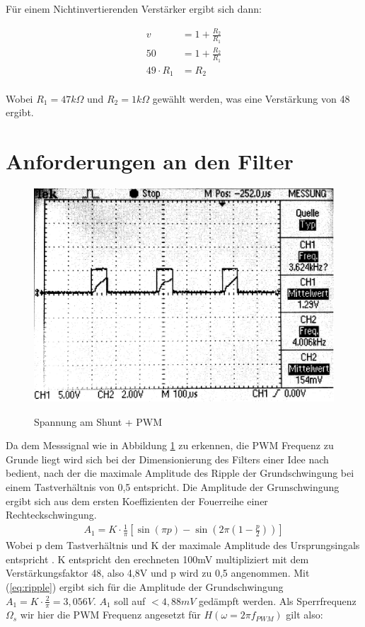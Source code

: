 \documentclass[11pt,twoside,a4paper,openright]{mpreport}
\begin{document}
Für einem Nichtinvertierenden Verstärker ergibt sich dann:

\begin{align*}
v &= 1 + \frac{R_2}{R_1}\\
50 &= 1 + \frac{R_2}{R_1}\\
49\cdot R_1 &= R_2
\end{align*}
\\
Wobei $R_1 = 47 k\Omega$ und $R_2 = 1 k\Omega$  gewählt werden, was eine Verstärkung von 48 ergibt.



\section{Anforderungen an den Filter}

\begin{figure}[H]
\centering
\includegraphics[width=.8\textwidth]{oszi.png}\\
\caption{Spannung am Shunt + PWM}%
\label{fig:pwm+i}
\end{figure}

Da dem Messsignal wie in Abbildung \ref{fig:pwm+i} zu erkennen, die PWM Frequenz zu Grunde liegt wird sich bei der Dimensionierung des Filters einer Idee nach \cite{Alter2008} bedient, nach der die maximale Amplitude des Ripple der Grundschwingung bei einem
Tastverhältnis von 0,5 entspricht. Die Amplitude der Grunschwingung ergibt sich aus dem ersten Koeffizienten der Fouerreihe einer Rechteckschwingung.
\begin{align}
A_1 = K\cdot \frac{1}{\pi}[\sin(\pi p)-\sin(2\pi(1-\frac{p}{2}))]
\label{eq:ripple}
\end{align}
Wobei p dem Tastverhältnis und K der maximale Amplitude des Ursprungsingals entspricht \cite{Alter2008}. K entspricht den erechneten 100mV multipliziert mit dem Verstärkungsfaktor 48, also 4,8V und p wird zu 0,5
angenommen. Mit (\ref{eq:ripple}) ergibt sich für die Amplitude der Grundschwingung $ A_1 = K\cdot \frac{2}{\pi} = 3,056V$. $A_1$ soll auf $ < 4,88mV$ gedämpft werden.
Als Sperrfrequenz $\Omega_s $ wir hier die PWM Frequenz angesetzt für $H(\omega=2\pi f_{PWM})$ gilt also:
\end{document}
